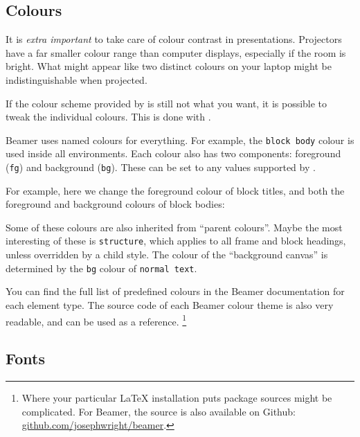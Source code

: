 %
%
\subsection{Colours}

\begin{practices}
It is \emph{extra important} to take care of colour contrast in presentations.
Projectors have a far smaller colour range than computer displays,
especially if the room is bright.
What might appear like two distinct colours on your laptop
might be indistinguishable when projected.
\end{practices}

If the colour scheme provided by  is still not what you want,
it is possible to tweak the individual colours.
This is done with .

Beamer uses named colours for everything.
For example, the \verb|block body| colour is used inside all  environments.
Each colour also has two components: foreground (\verb|fg|) and background (\verb|bg|).
These can be set to any values supported by .

For example, here we change the foreground colour of block titles,
and both the foreground and background colours of block bodies:%
\begin{ExampleCode}
\end{ExampleCode}
%
\begin{center}
\end{center}

Some of these colours are also inherited from ``parent colours''.
Maybe the most interesting of these is \verb|structure|,
which applies to all frame and block headings, unless overridden by a child style.
The colour of the ``background canvas'' is determined by the \verb|bg| colour of \verb|normal text|.

You can find the full list of predefined colours in the Beamer documentation for each element type.
The source code of each Beamer colour theme is also very readable,
and can be used as a reference.%
\footnote{Where your particular \LaTeX{} installation puts package sources might be complicated.
For Beamer, the source is also available on Github:
\url{github.com/josephwright/beamer}.}



\subsection{Fonts}

